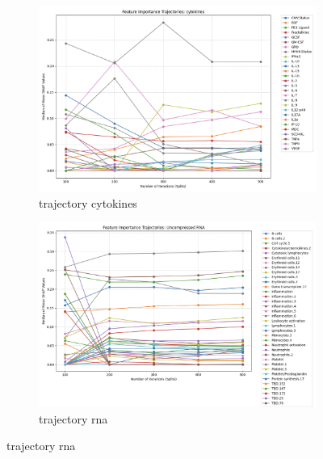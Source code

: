 \documentclass[12pt,a4paper]{report}
\begin{document}
\begin{figure}[h!]
    \centering
    \begin{subfigure}[b]{0.48\textwidth}
        \centering
        \includegraphics[width=\textwidth]{images/trajectory_cytokienes.png}
        \caption{trajectory cytokines}
        \label{fig:trajectory_cytokienes}
    \end{subfigure}
    \hfill
    \begin{subfigure}[b]{0.48\textwidth}
        \centering
        \includegraphics[width=\textwidth]{images/trajectory_RNA.png}
        \caption{trajectory \acrshort{rna}}
        \label{fig:trajectory_RNA}
    \end{subfigure}


\end{figure}
\end{document}
